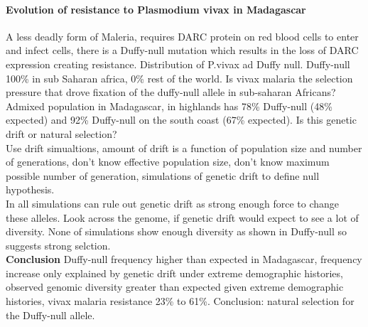 \documentclass[11pt]{article}
\begin{document}
\paragraph{Evolution of resistance to Plasmodium vivax in Madagascar}
A less deadly form of Maleria, requires DARC protein on red blood cells to enter and infect cells, there is a Duffy-null mutation which results in the loss of DARC expression creating resistance. Distribution of P.vivax ad Duffy null. Duffy-null 100\% in sub Saharan africa, 0\% rest of the world. Is vivax malaria the selection pressure that drove fixation of the duffy-null allele in sub-saharan Africans? Admixed population in Madagascar, in highlands has 78\% Duffy-null (48\% expected) and 92\% Duffy-null on the south coast (67\% expected). Is this genetic drift or natural selection? \\
Use drift simualtions, amount of drift is a function of population size and number of generations, don't know effective population size, don't know maximum possible number of generation, simulations of genetic drift to define null hypothesis. \\
In all simulations can rule out genetic drift as strong enough force to change these alleles. Look across the genome, if genetic drift would expect to see a lot of diversity. None of simulations show enough diversity as shown in Duffy-null so suggests strong selction.\\
{\bf Conclusion} Duffy-null frequency higher than expected in Madagascar, frequency increase only explained by genetic drift under extreme demographic histories, observed genomic diversity greater than expected given extreme demographic histories, vivax malaria resistance 23\% to 61\%. Conclusion: natural selection for the Duffy-null allele.
\end{document}
